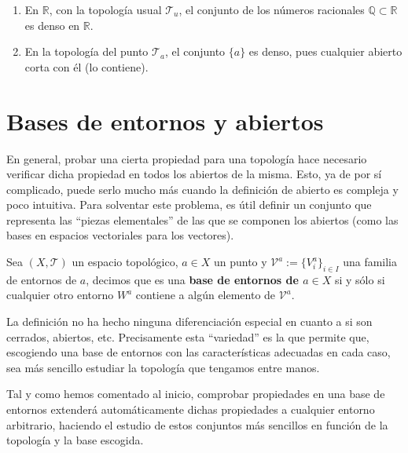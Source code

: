 \begin{ej}
\begin{enumerate}
    \item En $\mathbb{R}$, con la topología usual $\mathcal{T}_u$, el conjunto de los números racionales $\mathbb{Q} \subset \mathbb{R}$ es denso en $\mathbb{R}$.
    \item En la topología del punto $\mathcal{T}_a$, el conjunto $\{a\}$ es denso, pues cualquier abierto corta con él (lo contiene).
\end{enumerate}
\end{ej}

\section{Bases de entornos y abiertos}%
\label{sec:bases}
En general, probar una cierta propiedad para una topología hace necesario verificar dicha propiedad en todos los abiertos de la misma. Esto, ya de por sí complicado, puede serlo mucho más cuando la definición de abierto es compleja y poco intuitiva. Para solventar este problema, es útil definir un conjunto que representa las ``piezas elementales'' de las que se componen los abiertos (como las bases en espacios vectoriales para los vectores).

\begin{defi}
Sea $(X, \mathcal{T})$ un espacio topológico, $a\in X$ un punto y $\mathcal{V}^a := \{V_i^a\}_{i\in I}$ una familia de entornos de $a$, decimos que es una \textbf{base de entornos de $a \in X$} si y sólo si cualquier otro entorno $W^a$ contiene a algún elemento de $\mathcal{V}^a$.
\end{defi}

\begin{obs}
La definición no ha hecho ninguna diferenciación especial en cuanto a si son cerrados, abiertos, etc. Precisamente esta ``variedad'' es la que permite que, escogiendo una base de entornos con las características adecuadas en cada caso, sea más sencillo estudiar la topología que tengamos entre manos.

Tal y como hemos comentado al inicio, comprobar propiedades en una base de entornos extenderá automáticamente dichas propiedades a cualquier entorno arbitrario, haciendo el estudio de estos conjuntos más sencillos en función de la topología y la base escogida.
\end{obs}

